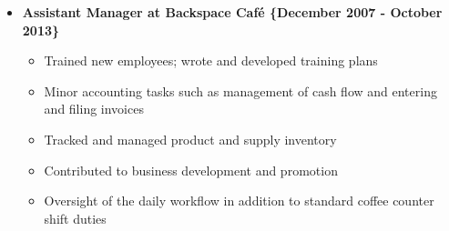 \begin{itemize}
\item \textbf{Assistant Manager at Backspace Caf\'{e}  \{December 2007 - October 2013\}}
\begin{itemize}
\item Trained new employees; wrote and developed training plans
\item Minor accounting tasks such as management of cash flow and entering and filing invoices
\item Tracked and managed product and supply inventory
\item Contributed to business development and promotion
\item Oversight of the daily workflow in addition to standard coffee counter shift duties
\end{itemize}


\end{itemize}



